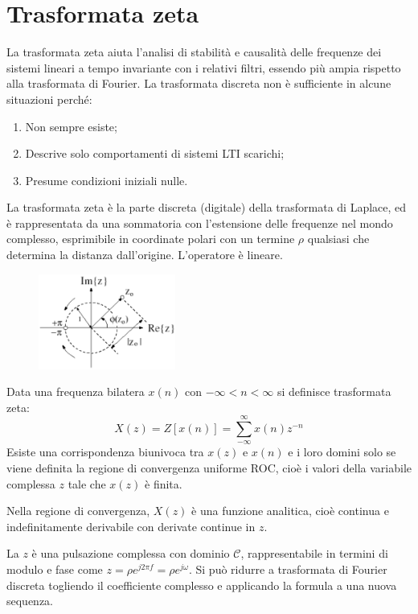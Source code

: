 \section{Trasformata zeta}
La trasformata zeta aiuta l'analisi di stabilità e causalità delle frequenze dei sistemi lineari a tempo invariante con i relativi filtri, essendo più ampia rispetto alla trasformata di Fourier. La trasformata discreta non è sufficiente in alcune situazioni perché:
\begin{enumerate}
	\item Non sempre esiste;
	\item Descrive solo comportamenti di sistemi LTI scarichi;
	\item Presume condizioni iniziali nulle.
\end{enumerate}

La trasformata zeta è la parte discreta (digitale) della trasformata di Laplace, ed è rappresentata da una sommatoria con l'estensione delle frequenze nel mondo complesso, esprimibile in coordinate polari con un termine $\rho$ qualsiasi che determina la distanza dall'origine. L'operatore è lineare.

\begin{figure}
	\vspace{-15pt}
	\includegraphics[width=0.4\textwidth]{Lezioni/Immagini/zeta}
	\vspace{-40pt}
\end{figure}

Data una frequenza bilatera $x(n)$ con $-\infty < n < \infty$ si definisce trasformata zeta:
$$X(z) = Z[x(n)] = \sum_{-\infty}^{\infty} x(n)z^{-n}$$
Esiste una corrispondenza biunivoca tra $x(z)$ e $x(n)$ e i loro domini solo se viene definita la regione di convergenza uniforme ROC, cioè i valori della variabile complessa $z$ tale che $x(z)$ è finita.

Nella regione di convergenza, $X(z)$ è una funzione analitica, cioè continua e indefinitamente derivabile con derivate continue in $z$.

La $z$ è una pulsazione complessa con dominio $\mathcal{C}$, rappresentabile in termini di modulo e fase come $z = \rho e^{j2\pi f} = \rho e^{j\omega}$. Si può ridurre a trasformata di Fourier discreta togliendo il coefficiente complesso e applicando la formula a una nuova sequenza. 

